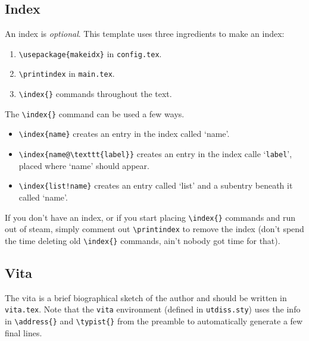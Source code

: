 \subsection{Index} %
\label{sec:usage:index}

An index is \emph{optional}.
This template uses three ingredients to make an index:
\begin{enumerate}
    \item \verb+\usepackage{makeidx}+ in \texttt{config.tex}.
    \item \verb+\printindex+ in \texttt{main.tex}.
    \item \verb+\index{}+ commands throughout the text.
\end{enumerate}
The \verb+\index{}+ command can be used a few ways.
\begin{itemize}
    \item \verb+\index{name}+ creates an entry in the index called `name'.
    \item \verb+\index{name@\texttt{label}}+ creates an entry in the index calle `\texttt{label}', placed where `name' should appear.
    \item \verb+\index{list!name}+ creates an entry called `list' and a subentry beneath it called `name'.
\end{itemize}
If you don't have an index, or if you start placing \verb+\index{}+ commands and run out of steam, simply comment out \verb+\printindex+ to remove the index (don't spend the time deleting old \verb+\index{}+ commands, ain't nobody got time for that).

\subsection{Vita} %

The vita is a brief biographical sketch of the author and should be written in \texttt{vita.tex}.
Note that the \verb"vita" environment (defined in \texttt{utdiss.sty}) uses the info in \verb+\address{}+ and \verb+\typist{}+ from the preamble to automatically generate a few final lines.
